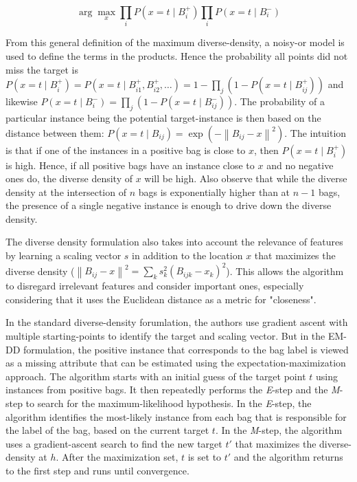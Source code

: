 \documentclass[conference]{IEEEtran}
\begin{document}
\begin{equation}
\arg\max_x \prod_i P(x = t \mid B_i^+) \prod_i P(x = t \mid B_i^-)
\end{equation}

From this general definition of the maximum diverse-density, a noisy-or model is used to define the terms in the products. Hence the probability all points did not miss the target is $P(x = t \mid B_i^+) = P(x = t \mid B^+_{i1}, B^+_{i2}, \dots) = 1 - \prod_j(1 - P(x =t \mid B^+_{ij}))$ and likewise $P(x = t \mid B_i^-) = \prod_j(1 - P(x = t \mid B_{ij}^-))$. The probability of a particular instance being the potential target-instance is then based on the distance between them: $P(x = t \mid B_{ij}) = \exp(- \left\| B_{ij} - x \right\|^2)$. The intuition is that if one of the instances in a positive bag is close to $x$, then $P(x = t \mid B_i^+)$ is high. Hence, if all positive bags have an instance close to $x$ and no negative ones do, the diverse density of $x$ will be high. Also observe that while the diverse density at the intersection of $n$ bags is exponentially higher than at $n - 1$ bags, the presence of a single negative instance is enough to drive down the diverse density.

The diverse density formulation also takes into account the relevance of features by learning a scaling vector $s$ in addition to the location $x$ that maximizes the diverse density ($\left\| B_{ij} - x \right\|^2 = \sum_k s_k^2(B_{ijk} - x_k)^2$). This allows the algorithm to disregard irrelevant features and consider important ones, especially considering that it uses the Euclidean distance as a metric for "closeness".

In the standard diverse-density forumlation, the authors use gradient ascent with multiple starting-points to identify the target and scaling vector. But in the EM-DD formulation, the positive instance that corresponds to the bag label is viewed as a missing attribute that can be estimated using the expectation-maximization approach\cite{zhang2001dd}. The algorithm starts with an initial guess of the target point $t$ using instances from positive bags. It then repeatedly performs the \textit{E}-step and the \textit{M}-step to search for the maximum-likelihood hypothesis. In the \textit{E}-step, the algorithm identifies the most-likely instance from each bag that is responsible for the label of the bag, based on the current target $t$. In the \textit{M}-step, the algorithm uses a gradient-ascent search to find the new target $t'$ that maximizes the diverse-density at $h$. After the maximization set, $t$ is set to $t'$ and the algorithm returns to the first step and runs until convergence.
\end{document}
